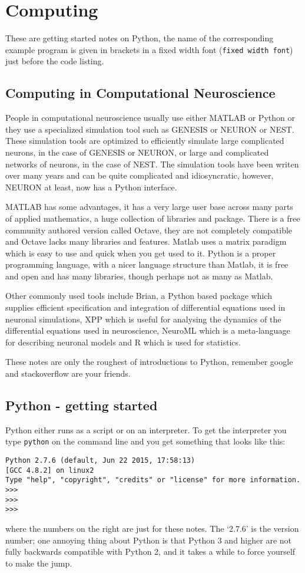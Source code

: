 \documentclass[11pt,a4paper]{scrartcl}
\begin{document}
\section*{Computing}
These are getting started notes on Python, the name of the
corresponding example program is given in brackets in a fixed width
font (\texttt{fixed width font}) just before the code listing.
\subsection*{Computing in Computational Neuroscience}
People in computational neuroscience usually use either MATLAB or
Python or they use a specialized simulation tool such as GENESIS or
NEURON or NEST. These simulation tools are optimized to efficiently
simulate large complicated neurons, in the case of GENESIS or NEURON,
or large and complicated networks of neurons, in the case of NEST. The
simulation tools have been writen over many years and can be quite
complicated and idiosyncratic, however, NEURON at least, now has a
Python interface. 

MATLAB has some advantages, it has a very large user base across many
parts of applied mathematics, a huge collection of libraries and
package. There is a free community authored version called Octave,
they are not completely compatible and Octave lacks many libraries and
features. Matlab uses a matrix paradigm which is easy to use and quick
when you get used to it. Python is a proper programming language, with
a nicer language structure than Matlab, it is free and open and has
many libraries, though perhaps not as many as Matlab.

Other commonly used tools include Brian, a Python based package which
supplies efficient specification and integration of differential
equations used in neuronal simulations, XPP which is useful for
analysing the dynamics of the differential equations used in
neuroscience, NeuroML which is a meta-language for describing neuronal
models and R which is used for statistics.

These notes are only the roughest of introductions to Python, remember
google and stackoverflow are your friends.

\subsection*{Python - getting started}
Python either runs as a script or on an interpreter. To get the
interpreter you type \texttt{python} on the command line and you get
something that looks like this:
\begin{lstlisting}[numbers=right]
Python 2.7.6 (default, Jun 22 2015, 17:58:13) 
[GCC 4.8.2] on linux2
Type "help", "copyright", "credits" or "license" for more information.
>>> 
>>> 
>>> 
\end{lstlisting}
where the numbers on the right are just for these notes. The
\lq{}2.7.6\rq{} is the version number; one annoying thing about Python
is that Python 3 and higher are not fully backwards compatible with
Python 2, and it takes a while to force yourself to make the jump.
\end{document}
